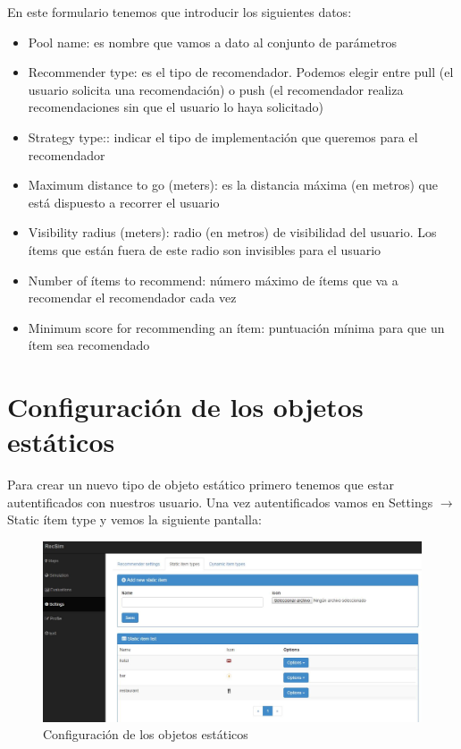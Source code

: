 En este formulario tenemos que introducir los siguientes datos:
\begin{itemize}
	\item Pool name: es nombre que vamos a dato al conjunto de parámetros
	\item Recommender type: es el tipo de recomendador. Podemos elegir entre pull (el usuario solicita una recomendación) o push (el recomendador realiza recomendaciones sin que el usuario lo haya solicitado)
	\item Strategy type:: indicar el tipo de implementación que queremos para el recomendador
	\item Maximum distance to go (meters): es la distancia máxima (en metros) que está dispuesto a recorrer el usuario
	\item Visibility radius (meters): radio (en metros) de visibilidad del usuario. Los ítems que están fuera de este radio son invisibles para el usuario 
	\item Number of ítems to recommend: número máximo de ítems que va a recomendar el recomendador cada vez
	\item Minimum score for recommending an ítem: puntuación mínima para que un ítem sea recomendado
\end{itemize}

\newpage

\section{Configuración de los objetos estáticos}\label{sec:confObjEstaticos}

Para crear un nuevo tipo de objeto estático primero tenemos que estar autentificados con nuestros usuario. Una vez autentificados vamos en Settings $\rightarrow$ Static ítem type y vemos la siguiente pantalla:

\begin{figure}[H]
	\centering\includegraphics[scale=0.35]{imagenes/capitulo3/config-objetos-estaticos.jpg}
	\caption{Configuración de los objetos estáticos}
	\label{img:ConfiguracionObjetosEstaticos}
\end{figure}


